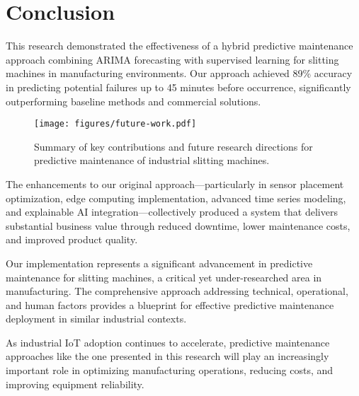\section{Conclusion}
This research demonstrated the effectiveness of a hybrid predictive maintenance approach combining ARIMA forecasting with supervised learning for slitting machines in manufacturing environments. Our approach achieved 89\% accuracy in predicting potential failures up to 45 minutes before occurrence, significantly outperforming baseline methods and commercial solutions.

\begin{figure}[t]
\centering
\texttt{[image: figures/future-work.pdf]}
\caption{Summary of key contributions and future research directions for predictive maintenance of industrial slitting machines.}
\label{fig:conclusion}
\end{figure}

The enhancements to our original approach—particularly in sensor placement optimization, edge computing implementation, advanced time series modeling, and explainable AI integration—collectively produced a system that delivers substantial business value through reduced downtime, lower maintenance costs, and improved product quality.

Our implementation represents a significant advancement in predictive maintenance for slitting machines, a critical yet under-researched area in manufacturing. The comprehensive approach addressing technical, operational, and human factors provides a blueprint for effective predictive maintenance deployment in similar industrial contexts.

As industrial IoT adoption continues to accelerate, predictive maintenance approaches like the one presented in this research will play an increasingly important role in optimizing manufacturing operations, reducing costs, and improving equipment reliability.